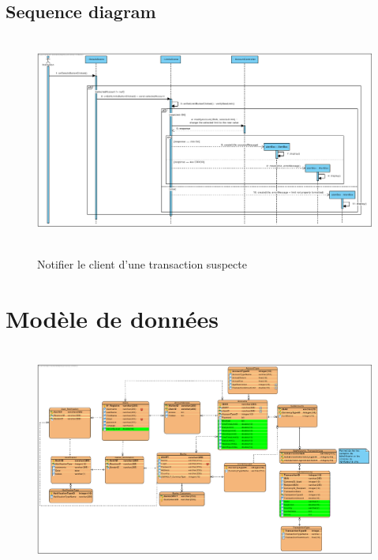 \documentclass[]{report}
\begin{document}
\newpage

\subsection{Sequence diagram}


\begin{figure}[h!]
\hbox{
    \centering\includegraphics[width=\linewidth]{img/Sequence 10 - Extension 6.pdf}
}
\caption{Notifier le client d'une transaction suspecte}
\end{figure}



\newpage




\section{Modèle de données}



\begin{figure}[h!]
\hspace{0.75cm}
\hbox{
	\centering\includegraphics[scale=0.69]{img/Entity Relation - Extension 6.pdf} %
}
\end{figure}
\end{document}
